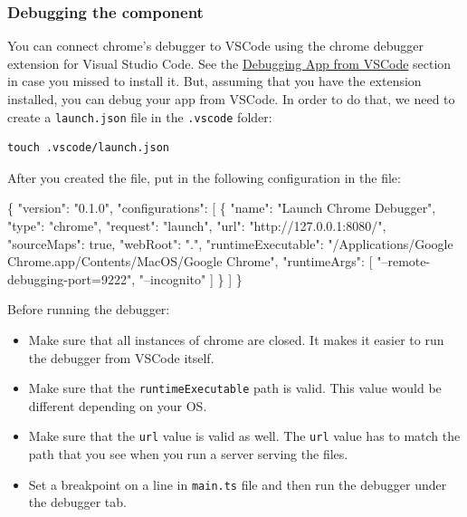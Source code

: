 \documentclass[12pt,]{article}
\newenvironment{Shaded}{}{}
\newcommand{\KeywordTok}[1]{\textcolor[rgb]{0.00,0.00,1.00}{{#1}}}
\newcommand{\DataTypeTok}[1]{{#1}}
\newcommand{\StringTok}[1]{\textcolor[rgb]{0.00,0.50,0.50}{{#1}}}
\newcommand{\OtherTok}[1]{\textcolor[rgb]{1.00,0.25,0.00}{{#1}}}
\newcommand{\FunctionTok}[1]{{#1}}
\providecommand{\tightlist}{%
  \setlength{\itemsep}{0pt}\setlength{\parskip}{0pt}}
\begin{document}
\subsubsection{Debugging the component}\label{debugging-the-component}

You can connect chrome's debugger to VSCode using the chrome debugger
extension for Visual Studio Code. See the
\protect\hyperlink{debugging-app-from-vscode}{Debugging App from VSCode}
section in case you missed to install it. But, assuming that you have
the extension installed, you can debug your app from VSCode. In order to
do that, we need to create a \texttt{launch.json} file in the
\texttt{.vscode} folder:

\begin{verbatim}
touch .vscode/launch.json
\end{verbatim}

After you created the file, put in the following configuration in the
file:

\begin{Shaded}
\begin{Highlighting}[numbers=left,,]
\FunctionTok{\{}
  \DataTypeTok{"version"}\FunctionTok{:} \StringTok{"0.1.0"}\FunctionTok{,}
  \DataTypeTok{"configurations"}\FunctionTok{:} \OtherTok{[}
    \FunctionTok{\{}
      \DataTypeTok{"name"}\FunctionTok{:} \StringTok{"Launch Chrome Debugger"}\FunctionTok{,}
      \DataTypeTok{"type"}\FunctionTok{:} \StringTok{"chrome"}\FunctionTok{,}
      \DataTypeTok{"request"}\FunctionTok{:} \StringTok{"launch"}\FunctionTok{,}
      \DataTypeTok{"url"}\FunctionTok{:} \StringTok{"http://127.0.0.1:8080/"}\FunctionTok{,}
      \DataTypeTok{"sourceMaps"}\FunctionTok{:} \KeywordTok{true}\FunctionTok{,}
      \DataTypeTok{"webRoot"}\FunctionTok{:} \StringTok{"."}\FunctionTok{,}
      \DataTypeTok{"runtimeExecutable"}\FunctionTok{:} \StringTok{"/Applications/Google Chrome.app/Contents/MacOS/Google Chrome"}\FunctionTok{,}
      \DataTypeTok{"runtimeArgs"}\FunctionTok{:} \OtherTok{[}
        \StringTok{"--remote-debugging-port=9222"}\OtherTok{,}
        \StringTok{"--incognito"}
      \OtherTok{]}
    \FunctionTok{\}}
  \OtherTok{]}
\FunctionTok{\}}
\end{Highlighting}
\end{Shaded}

Before running the debugger:

\begin{itemize}
\tightlist
\item
  Make sure that all instances of chrome are closed. It makes it easier
  to run the debugger from VSCode itself.
\item
  Make sure that the \texttt{runtimeExecutable} path is valid. This
  value would be different depending on your OS.
\item
  Make sure that the \texttt{url} value is valid as well. The
  \texttt{url} value has to match the path that you see when you run a
  server serving the files.
\item
  Set a breakpoint on a line in \texttt{main.ts} file and then run the
  debugger under the debugger tab.
\end{itemize}
\end{document}
